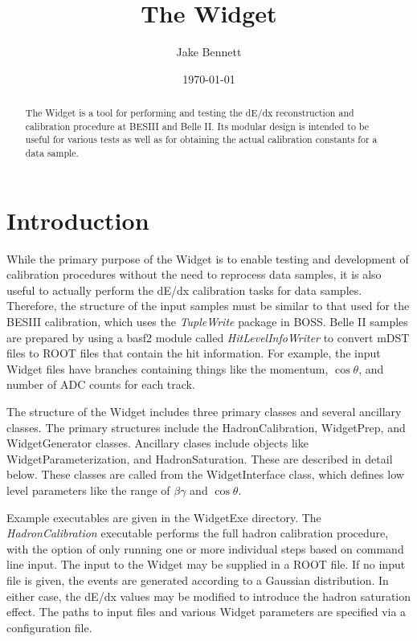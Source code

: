 \documentclass{article}
\begin{document}
\title{The Widget}

\author{Jake Bennett}

\date{\today}

\maketitle

\begin{abstract}
The Widget is a tool for performing and testing the dE/dx reconstruction and calibration procedure
at BESIII and Belle II. Its modular design is intended to be useful for various tests as well as for
obtaining the actual calibration constants for a data sample.
\end{abstract}


\section{Introduction}

While the primary purpose of the Widget is to enable testing and development of calibration
procedures without the need to reprocess data samples, it is also useful to actually perform the
dE/dx calibration tasks for data samples. Therefore, the structure of the input samples must
be similar to that used for the BESIII calibration, which uses the \textit{TupleWrite} package in 
BOSS. Belle II samples are prepared by using a basf2 module called \textit{HitLevelInfoWriter} to
convert mDST files to ROOT files that contain the hit information. For example, the input Widget
files have branches containing things like the momentum, $\cos{\theta}$, and number of ADC counts
for each track.

The structure of the Widget includes three primary classes and several ancillary classes. The 
primary structures include the HadronCalibration, WidgetPrep, and WidgetGenerator classes. 
Ancillary clases include objects like WidgetParameterization, and HadronSaturation. These are 
described in detail below. These classes are called from the WidgetInterface class, which defines 
low level parameters like the range of $\beta\gamma$ and $\cos{\theta}$.

Example executables are given in the WidgetExe directory. The \textit{HadronCalibration} 
executable performs the full hadron calibration procedure, with the option of only running 
one or more individual steps based on command line input. The input to the Widget may be supplied 
in a ROOT file. If no input file is given, the events are generated according to a Gaussian 
distribution. In either case, the dE/dx values may be modified to introduce the hadron saturation 
effect. The paths to input files and various Widget parameters are specified via a configuration 
file.
\end{document}
